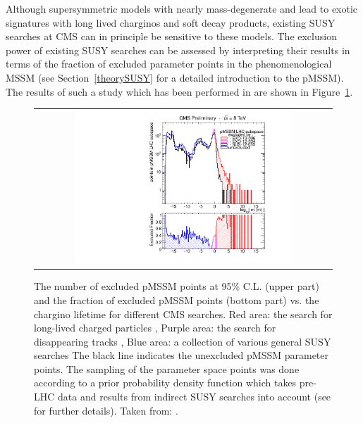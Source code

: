 
Although supersymmetric models with nearly mass-degenerate \chipm and \chiO lead to exotic signatures with long lived charginos and soft decay products, existing SUSY searches at CMS can in principle be sensitive to these models. The exclusion power of existing SUSY searches can be assessed by interpreting their results in terms of the fraction of excluded parameter points in the phenomenological MSSM (see Section~\ref{theorySUSY} for a detailed introduction to the pMSSM). The results of such a study which has been performed in \cite{bib:CMS:DT_8TeV} are shown in Figure~\ref{fig:pMSSMplot}. 
\begin{figure}[!t]
  \centering 
  \begin{tabular}{c}
    \includegraphics[width=0.75\textwidth]{figures/analysis/pMSSM_vs_ctau.pdf}
  \end{tabular}
  \caption{The number of excluded pMSSM points at 95\% C.L. (upper part) and the fraction of excluded pMSSM points (bottom part) vs. the chargino lifetime for different CMS searches.
           Red area: the search for long-lived charged particles \cite{bib:CMS:HSCP_8TeV},
           Purple area: the search for disappearing tracks  \cite{bib:CMS:DT_8TeV},
           Blue area: a collection of various general SUSY searches \cite{bib:CMS:pMSSMinterpretation_7TeV_PAS}
           The black line indicates the unexcluded pMSSM parameter points.
           The sampling of the parameter space points was done according to a prior probability density function which takes pre-LHC data and results from indirect SUSY searches into account (see \cite{bib:CMS:HSCPReinterpreation_PAS} for further details).
           Taken from: \cite{bib:pMSSMplot_source_from_DT}.}
  \label{fig:pMSSMplot}
\end{figure}
